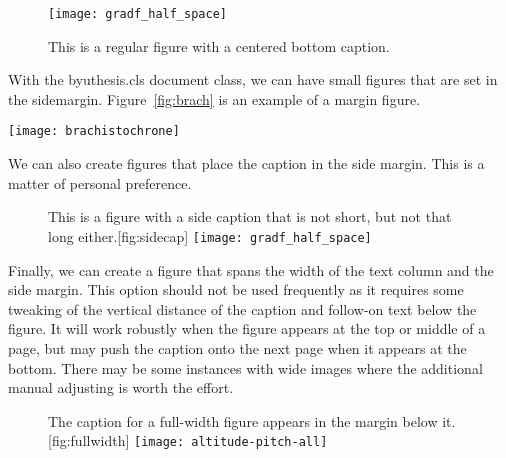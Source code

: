 \begin{figure}[htbp]
	\centering
	\texttt{[image: gradf\_half\_space]}
	\caption{This is a regular figure with a centered bottom caption.}
	\label{fig:gradf_half_space}
\end{figure}

\myshorttext

With the {\ttfamily byuthesis.cls} document class, we can have small figures that are set in the sidemargin. Figure~\ref{fig:brach} is an example of a margin figure.
\begin{marginfigure}
	\texttt{[image: brachistochrone]}
	\caption{This is an example of a margin figure.}
	\label{fig:brach}
\end{marginfigure}

\myshorttext

We can also create figures that place the caption in the side margin. This is a matter of personal preference.
\begin{figure}[htbp]
	\begin{sidecaption}{This is a figure with a side caption that is not short, but not that long either.}[fig:sidecap]
		\centering
		\texttt{[image: gradf\_half\_space]}
	\end{sidecaption}
\end{figure}

Finally, we can create a figure that spans the width of the text column and the side margin. This option should not be used frequently as it requires some tweaking of the vertical distance of the caption and follow-on text below the figure. It will work robustly when the figure appears at the top or middle of a page, but may push the caption onto the next page when it appears at the bottom. There may be some instances with wide images where the additional manual adjusting is worth the effort.

\begin{figure}
	\setlength{\sidecapraise}{-1.3cm}   %
	\begin{sidecaption}{The caption for a full-width figure appears in the margin below it.}[fig:fullwidth] %
		\texttt{[image: altitude-pitch-all]}
	\end{sidecaption}
	\vskip -1.7cm     %
\end{figure}

